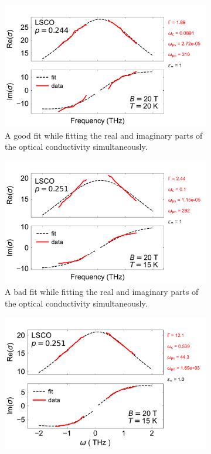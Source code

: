 \begin{figure}
    \centering
    \begin{subfigure}{0.49\textwidth}
        \includegraphics[width=\textwidth]{figures/drude_fit_good.pdf}
        \caption{A good fit while fitting the real and imaginary parts of the optical conductivity
            simultaneously.}
        \label{fig:drude_fit_good}
    \end{subfigure}
    \begin{subfigure}{0.5\textwidth}
        \centering
        \includegraphics[width=\textwidth]{figures/drude_fit_bad.pdf}
        \caption{A bad fit while fitting the real and imaginary parts of the optical conductivity
            simultaneously.}
        \label{fig:drude_fit_bad}
    \end{subfigure}
    \begin{subfigure}{0.49\textwidth}
        \centering
        \includegraphics[width=\textwidth]{figures/drude_fit_fixed.pdf}

\end{subfigure}
\end{figure}
